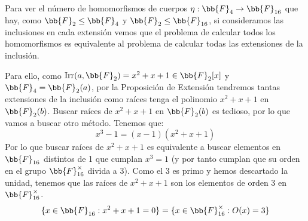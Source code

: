 \begin{ejercicio}
    \noindent
    Para ver el número de homomorfismos de cuerpos $\eta:\bb{F}_4\to \bb{F}_{16}$ que hay, como $\bb{F}_2\leq \bb{F}_4$ y $\bb{F}_2\leq \bb{F}_{16}$, si consideramos las inclusiones en cada extensión vemos que el problema de calcular todos los homomorfismos es equivalente al problema de calcular todas las extensiones de la inclusión.

    \begin{figure}[H]
        \centering
    \end{figure}

    \noindent
    Para ello, como $\Irr(a,\bb{F}_2) = x^2+x+1\in \bb{F}_2[x]$ y $\bb{F}_4 = \bb{F}_2(a)$, por la Proposición de Extensión tendremos tantas extensiones de la inclusión como raíces tenga el polinomio $x^2+x+1$ en $\bb{F}_2(b)$. Buscar raíces de $x^2+x+1$ en $\bb{F}_2(b)$ es tedioso, por lo que vamos a buscar otro método. Tenemos que:
    \begin{equation*}
        x^3-1 = (x-1)(x^2+x+1)
    \end{equation*}
    Por lo que buscar raíces de $x^2+x+1$ es equivalente a buscar elementos en $\bb{F}_{16}$ distintos de 1 que cumplan $x^3 = 1$ (y por tanto cumplan que su orden en el grupo $\bb{F}_{16}^\times$ divida a $3$). Como el $3$ es primo y hemos descartado la unidad, tenemos que las raíces de $x^2+x+1$ son los elementos de orden $3$ en $\bb{F}_{16}^\times$.
    \begin{equation*}
        \{x\in \bb{F}_{16} : x^2+x+1 = 0\} = \{x\in \bb{F}_{16}^\times : O(x) = 3\}
    \end{equation*}


\end{ejercicio}
